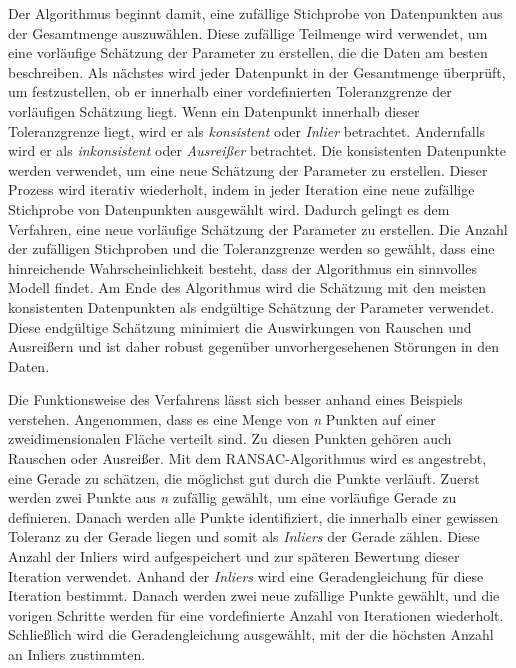 Der Algorithmus beginnt damit, eine zufällige Stichprobe von Datenpunkten aus der Gesamtmenge auszuwählen. Diese zufällige Teilmenge wird verwendet, um eine vorläufige Schätzung der Parameter zu erstellen, die die Daten am besten beschreiben. Als nächstes wird jeder Datenpunkt in der Gesamtmenge überprüft, um festzustellen, ob er innerhalb einer vordefinierten Toleranzgrenze der vorläufigen Schätzung liegt. Wenn ein Datenpunkt innerhalb dieser Toleranzgrenze liegt, wird er als \textit{konsistent} oder \textit{Inlier} betrachtet. Andernfalls wird er als \textit{inkonsistent} oder \textit{Ausreißer} betrachtet. Die konsistenten Datenpunkte werden verwendet, um eine neue Schätzung der Parameter zu erstellen. Dieser Prozess wird iterativ wiederholt, indem in jeder Iteration eine neue zufällige Stichprobe von Datenpunkten ausgewählt wird. Dadurch gelingt es dem Verfahren, eine neue vorläufige Schätzung der Parameter zu erstellen. Die Anzahl der zufälligen Stichproben und die Toleranzgrenze werden so gewählt, dass eine hinreichende Wahrscheinlichkeit besteht, dass der Algorithmus ein sinnvolles Modell findet. Am Ende des Algorithmus wird die Schätzung mit den meisten konsistenten Datenpunkten als endgültige Schätzung der Parameter verwendet. Diese endgültige Schätzung minimiert die Auswirkungen von Rauschen und Ausreißern und ist daher robust gegenüber unvorhergesehenen Störungen in den Daten. \autocite[383-384]{fischler_random_1981} \autocite[3]{martinez-otzeta_ransac_2023}

Die Funktionsweise des Verfahrens lässt sich besser anhand eines Beispiels verstehen. Angenommen, dass es eine Menge von \textit{n} Punkten auf einer zweidimensionalen Fläche verteilt sind. Zu diesen Punkten gehören auch Rauschen oder Ausreißer. Mit dem RANSAC-Algorithmus wird es angestrebt, eine Gerade zu schätzen, die möglichst gut durch die Punkte verläuft. Zuerst werden zwei Punkte aus \textit{n} zufällig gewählt, um eine vorläufige Gerade zu definieren. Danach werden alle Punkte identifiziert, die innerhalb einer gewissen Toleranz zu der Gerade liegen und somit als \textit{Inliers} der Gerade zählen. Diese Anzahl der Inliers wird aufgespeichert und zur späteren Bewertung dieser Iteration verwendet. Anhand der \textit{Inliers} wird eine Geradengleichung für diese Iteration bestimmt. Danach werden zwei neue zufällige Punkte gewählt, und die vorigen Schritte werden für eine vordefinierte Anzahl von Iterationen wiederholt. Schließlich wird die Geradengleichung ausgewählt, mit der die höchsten Anzahl an Inliers zustimmten. 

